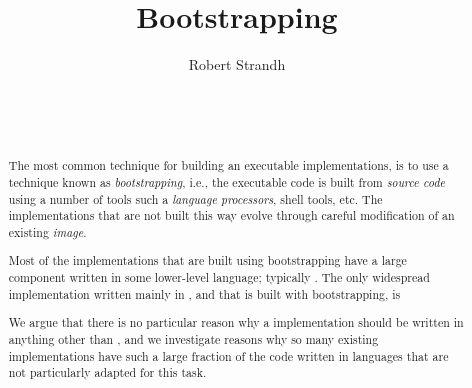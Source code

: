 \documentclass{sig-alternate-05-2015}
\def\inputtex#1{}
\begin{document}
\title{Bootstrapping \commonlisp{}}
\author{\alignauthor
Robert Strandh\\
\\
\\
\\
}


\maketitle

\begin{abstract}
The most common technique for building an executable \commonlisp{}
implementations, is to use a technique known as
\textit{bootstrapping}, i.e., the executable code is built from
\emph{source code} using a number of tools such a \emph{language
  processors}, shell tools, etc.  The \commonlisp{} implementations
that are not built this way evolve through careful modification of an
existing \emph{image}.

Most of the implementations that are built using bootstrapping have a
large component written in some lower-level language; typically
\clanguage{}.  The only widespread \commonlisp{} implementation
written mainly in \commonlisp{}, and that is built with bootstrapping,
is \sbcl{}

We argue that there is no particular reason why a \commonlisp{}
implementation should be written in anything other than \commonlisp{},
and we investigate reasons why so many existing implementations have
such a large fraction of the code written in languages that are not
particularly adapted for this task.
\end{abstract}





\inputtex{sec-introduction.tex}
\inputtex{sec-previous.tex}



\end{document}
